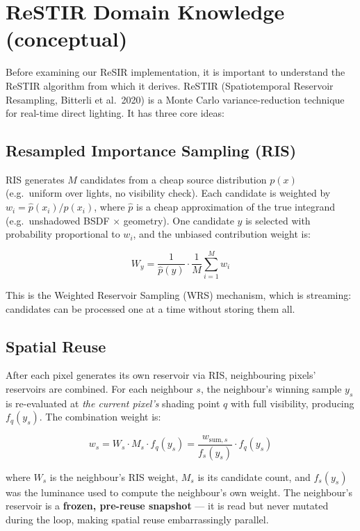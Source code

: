 \section{ReSTIR Domain Knowledge (conceptual)}
\label{sec:restir_concept}

Before examining our ReSIR implementation, it is important to understand the
ReSTIR algorithm from which it derives. ReSTIR (Spatiotemporal Reservoir
Resampling, Bitterli et al.\ 2020) is a Monte Carlo variance-reduction
technique for real-time direct lighting. It has three core ideas:

\subsection{Resampled Importance Sampling (RIS)}

RIS generates $M$ candidates from a cheap source distribution $p(x)$ (e.g.\
uniform over lights, no visibility check). Each candidate is weighted by
$w_i = \hat{p}(x_i) / p(x_i)$, where $\hat{p}$ is a cheap approximation of the
true integrand (e.g.\ unshadowed BSDF $\times$ geometry). One candidate $y$ is
selected with probability proportional to $w_i$, and the unbiased contribution
weight is:

\[
W_y = \frac{1}{\hat{p}(y)} \cdot \frac{1}{M} \sum_{i=1}^{M} w_i
\]

This is the Weighted Reservoir Sampling (WRS) mechanism, which is streaming:
candidates can be processed one at a time without storing them all.

\subsection{Spatial Reuse}

After each pixel generates its own reservoir via RIS, neighbouring pixels'
reservoirs are combined. For each neighbour $s$, the neighbour's winning sample
$y_s$ is re-evaluated at \emph{the current pixel's} shading point $q$ with full
visibility, producing $f_q(y_s)$. The combination weight is:

\[
w_s = W_s \cdot M_s \cdot f_q(y_s) = \frac{w_{\text{sum},s}}{f_s(y_s)} \cdot f_q(y_s)
\]

where $W_s$ is the neighbour's RIS weight, $M_s$ is its candidate count, and
$f_s(y_s)$ was the luminance used to compute the neighbour's own weight. The
neighbour's reservoir is a \textbf{frozen, pre-reuse snapshot} --- it is read
but never mutated during the loop, making spatial reuse embarrassingly parallel.

